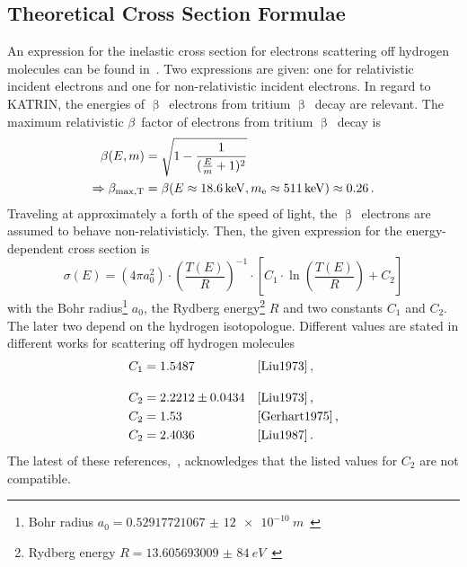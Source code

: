 \subsection{Theoretical Cross Section Formulae}
\label{sec:eDepScatCrossSecSourcesTheory}
An expression for the inelastic cross section for electrons scattering off hydrogen molecules can be found in~\cite{Liu1973}. Two expressions are given: one for relativistic incident electrons and one for non-relativistic incident electrons. In regard to KATRIN, the energies of $\upbeta$~electrons from tritium $\upbeta$~decay are relevant. The maximum relativistic $\beta$~factor of electrons from tritium $\upbeta$~decay is
\begin{align}
\beta(E, m) &= 
\sqrt{
	1-\frac{1}{
		(\frac{E}{m}+1)^2
	}
} \label{eq:eDepScatCrossSecSourcesCrossSecBetaFactor} \\
\Rightarrow\beta_\mathrm{max, T} &= 
\beta(E\approx\SI{18.6}{keV}, m_{\mathrm{e}}\approx\SI{511}{keV})\approx0.26 
\text{\,.}
\end{align}
Traveling at approximately a forth of the speed of light, the $\upbeta$~electrons are assumed to behave non-relativisticly. Then, the given expression for the energy-dependent cross section is~\cite{Liu1973}
\begin{equation}
\label{eq:eDepScatCrossSecSourcesCrossSecLiu}
\sigma(E) =  
(4 \pi a_0^2) \cdot
\left(\frac{T(E)}{R}\right)^{-1} \cdot
\left[
C_1 \cdot \ln{\left(\frac{T(E)}{R}\right)} + C_2
\right]
\end{equation}
with the Bohr radius\footnote{Bohr radius $a_0=\SI[separate-uncertainty=false]{0.529 177 210 67(12)e-10}{m}$~\cite{ReviewOfParticlePhysics}} $a_0$, 
the Rydberg energy\footnote{Rydberg energy $R=\SI[separate-uncertainty=false]{13.605 693 009(84)}{eV}$~\cite{ReviewOfParticlePhysics}} $R$ and two constants $C_1$ and $C_2$. The later two depend on the hydrogen isotopologue. Different values are stated in different works for scattering off hydrogen molecules
\begin{subequations}
\label{eq:eDepScatCrossSecSourcesCrossSecLiuConstants}
\begin{align}
C_1 &= 1.5487 &&\text{\cite{Liu1973}}
\label{eq:eDepScatCrossSecSourcesCrossSecLiuConstantsC1}
\text{\,,}\\[10pt]
C_2 &= 2.2212\pm0.0434 &&\text{\cite{Liu1973}}
\label{eq:eDepScatCrossSecSourcesCrossSecLiuConstantsC2Uncert}
\text{\,,}\\
C_2 &= 1.53 &&\text{\cite{Gerhart1975}}
\text{\,,}\\
C_2 &= 2.4036 &&\text{\cite{Liu1987}}
\label{eq:eDepScatCrossSecSourcesCrossSecLiuConstantsC2}
\text{\,.}
\end{align}
\end{subequations}
The latest of these references,~\cite{Liu1987}, acknowledges that the listed values for $C_2$ are not compatible.

